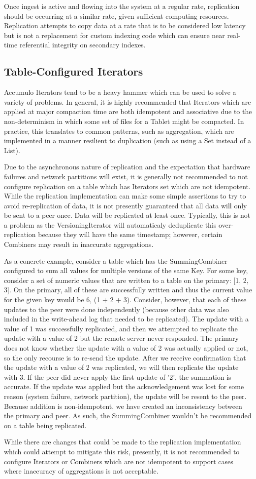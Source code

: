 Once ingest is active and flowing into the system at a regular rate, replication should be occurring at a similar rate, 
given sufficient computing resources. Replication attempts to copy data at a rate that is to be considered low latency
but is not a replacement for custom indexing code which can ensure near real-time referential integrity on secondary indexes.

\subsection{Table-Configured Iterators}

Accumulo Iterators tend to be a heavy hammer which can be used to solve a variety of problems. In general, it is highly
recommended that Iterators which are applied at major compaction time are both idempotent and associative due to the
non-determinism in which some set of files for a Tablet might be compacted. In practice, this translates to common patterns,
such as aggregation, which are implemented in a manner resilient to duplication (such as using a Set instead of a List).

Due to the asynchronous nature of replication and the expectation that hardware failures and network partitions will exist,
it is generally not recommended to not configure replication on a table which has Iterators set which are not idempotent.
While the replication implementation can make some simple assertions to try to avoid re-replication of data, it is not
presently guaranteed that all data will only be sent to a peer once. Data will be replicated at least once. Typically,
this is not a problem as the VersioningIterator will automaticaly deduplicate this over-replication because they will
have the same timestamp; however, certain Combiners may result in inaccurate aggregations.

As a concrete example, consider a table which has the SummingCombiner configured to sum all values for
multiple versions of the same Key. For some key, consider a set of numeric values that are written to a table on the
primary: [1, 2, 3]. On the primary, all of these are successfully written and thus the current value for the given key
would be 6, (1 + 2 + 3). Consider, however, that each of these updates to the peer were done independently (because
other data was also included in the write-ahead log that needed to be replicated). The update with a value of 1 was
successfully replicated, and then we attempted to replicate the update with a value of 2 but the remote server never
responded. The primary does not know whether the update with a value of 2 was actually applied or not, so the
only recourse is to re-send the update. After we receive confirmation that the update with a value of 2 was replicated,
we will then replicate the update with 3. If the peer did never apply the first update of '2', the summation is accurate.
If the update was applied but the acknowledgement was lost for some reason (system failure, network partition), the
update will be resent to the peer. Because addition is non-idempotent, we have created an inconsistency between the
primary and peer. As such, the SummingCombiner wouldn't be recommended on a table being replicated.

While there are changes that could be made to the replication implementation which could attempt to mitigate this risk,
presently, it is not recommended to configure Iterators or Combiners which are not idempotent to support cases where
inaccuracy of aggregations is not acceptable.
